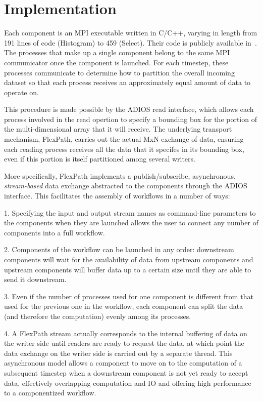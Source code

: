 \section{Implementation}
\label{s:impl}

Each component is an MPI executable
written in C/C++, varying in length from
191 lines of code (Histogram) to
459 (Select).
Their code is publicly available
in~\cite{champsaur:superglue-repo}.
The processes that make up a single
component belong to the same MPI communicator
once the component is launched.
For each timestep, these processes
communicate to determine how to partition
the overall incoming dataset so that each
process receives an approximately
equal amount of data to operate on.

This procedure is made possible by the ADIOS
read interface, which allows each process
involved in the read opertion to specify a
bounding box for the portion of the multi-dimensional
array that it will receive.
The underlying transport mechanism, FlexPath,
carries out the actual MxN exchange of data,
ensuring each reading process receives
all the data that it specifes in its bounding box,
even if this portion is itself partitioned among several writers.

More specifically, FlexPath implements a publish/subscribe,
asynchronous, \textit{stream-based} data exchange abstracted to the
components through the ADIOS interface. This facilitates
the assembly of \sys workflows in a number of ways:

1. Specifying the input and output stream
names as command-line parameters to the \sys components 
when they are launched allows the user
to connect any number of components into
a full workflow.

2. Components of the workflow can be
launched in any order: downstream components
will wait for the availability of data from
upstream components and upstream
components will buffer data up to a certain
size until they are able to send it
downstream.

3. Even if the number of processes used for one
component is different from that used for the previous
one in the workflow, each component can split the data
(and therefore the computation) evenly among its processes.

4. A FlexPath stream actually corresponds
to the internal buffering of data on the writer side
until readers are ready to request the data,
at which point the data exchange
on the writer side is carried out
by a separate thread.
This asynchronous model allows a 
\sys component to move on to the computation
of a subsequent timestep when a downstream
component is not yet ready to accept data,
effectively overlapping computation and IO
and offering high performance to a componentized workflow.

